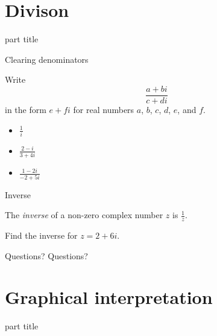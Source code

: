 \documentclass{beamer}
\begin{document}
\section{Divison}

\begin{frame}
\begin{beamercolorbox}[sep=12pt,center]{part title}
\insertsection\par
\end{beamercolorbox}
\end{frame}

\begin{frame}{Clearing denominators}
\begin{example}
Write 
\begin{equation*}
\frac{a+bi}{c+di}
\end{equation*}
in the form $e+fi$ for real numbers $a$, $b$, $c$, $d$, $e$, and $f$.
\end{example}
\begin{example}
\begin{itemize}
\item $\frac{1}{i}$ %
\item $\frac{2-i}{3+4i}$ %
\item $\frac{1-2i}{-2+5i}$ %
\end{itemize}
\end{example}
\end{frame}

\begin{frame}{Inverse}
\begin{definition}
The \emph{inverse} of a non-zero complex number $z$ is $\frac{1}{z}$.
\end{definition}
\begin{example}
Find the inverse for $z = 2+6i$.
\end{example}
\end{frame}

\begin{frame}{Questions?}
Questions?
\end{frame}


\section{Graphical interpretation}

\begin{frame}
\begin{beamercolorbox}[sep=12pt,center]{part title}
\insertsection\par
\end{beamercolorbox}
\end{frame}
\end{document}
